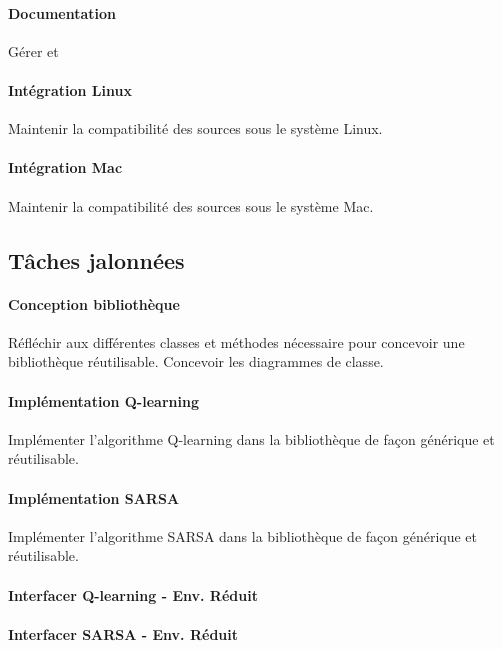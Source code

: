 \documentclass[a4paper,12pt]{article}
\begin{document}
      \paragraph{Documentation} Gérer et 
      
      \paragraph{Intégration Linux} Maintenir la compatibilité des sources sous le système Linux.
      
      \paragraph{Intégration Mac} Maintenir la compatibilité des sources sous le système Mac.

    \subsection{Tâches jalonnées}
    
      \paragraph{Conception bibliothèque} Réfléchir aux différentes classes et méthodes nécessaire pour concevoir une
      bibliothèque réutilisable. Concevoir les diagrammes de classe.
      
      \paragraph{Implémentation Q-learning} Implémenter l'algorithme Q-learning dans la bibliothèque de façon générique
      et réutilisable.
      
      \paragraph{Implémentation SARSA}  Implémenter l'algorithme SARSA dans la bibliothèque de façon générique
      et réutilisable.
      
      \paragraph{Interfacer Q-learning - Env. Réduit}
      
      \paragraph{Interfacer SARSA - Env. Réduit}
      
\end{document}
